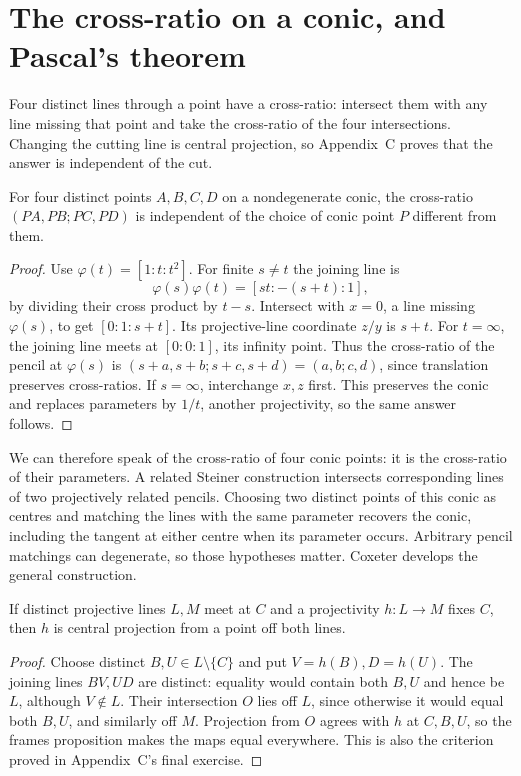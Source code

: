 \section{The cross-ratio on a conic, and Pascal's theorem}

Four distinct lines through a point have a cross-ratio: intersect them with any line missing that point and take the cross-ratio of the four intersections. Changing the cutting line is central projection, so Appendix~C proves that the answer is independent of the cut.

\begin{theorem}\label{geometry:thm:chaslesconic}
For four distinct points $A,B,C,D$ on a nondegenerate conic, the cross-ratio $(PA,PB;PC,PD)$ is independent of the choice of conic point $P$ different from them.
\end{theorem}
\begin{proof}
Use $\varphi(t)=[1:t:t^2]$. For finite $s\ne t$ the joining line is
\[
\varphi(s)\varphi(t)=[st:-(s+t):1],
\]
by dividing their cross product by $t-s$. Intersect with $x=0$, a line missing $\varphi(s)$, to get $[0:1:s+t]$. Its projective-line coordinate $z/y$ is $s+t$. For $t=\infty$, the joining line meets at $[0:0:1]$, its infinity point. Thus the cross-ratio of the pencil at $\varphi(s)$ is $(s+a,s+b;s+c,s+d)=(a,b;c,d)$, since translation preserves cross-ratios. If $s=\infty$, interchange $x,z$ first. This preserves the conic and replaces parameters by $1/t$, another projectivity, so the same answer follows.
\end{proof}

We can therefore speak of the cross-ratio of four conic points: it is the cross-ratio of their parameters. A related Steiner construction intersects corresponding lines of two projectively related pencils. Choosing two distinct points of this conic as centres and matching the lines with the same parameter recovers the conic, including the tangent at either centre when its parameter occurs. Arbitrary pencil matchings can degenerate, so those hypotheses matter. Coxeter develops the general construction.

\begin{lemma}\label{geometry:lem:perspectivity}
If distinct projective lines $L,M$ meet at $C$ and a projectivity $h:L\to M$ fixes $C$, then $h$ is central projection from a point off both lines.
\end{lemma}
\begin{proof}
Choose distinct $B,U\in L\setminus\{C\}$ and put $V=h(B),D=h(U)$. The joining lines $BV,UD$ are distinct: equality would contain both $B,U$ and hence be $L$, although $V\notin L$. Their intersection $O$ lies off $L$, since otherwise it would equal both $B,U$, and similarly off $M$. Projection from $O$ agrees with $h$ at $C,B,U$, so the frames proposition makes the maps equal everywhere. This is also the criterion proved in Appendix~C's final exercise.
\end{proof}

